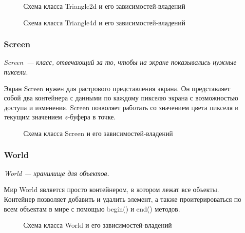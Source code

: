 \documentclass{article}
\begin{document}
\begin{center}
\begin{figure}[h]
\caption{Схема класса Triangle2d и его зависимостей-владений}
\label{ris:image}
\end{figure}
\begin{figure}[h]
\caption{Схема класса Triangle4d и его зависимостей-владений}
\label{ris:image}
\end{figure}
\end{center}

\newpage

\subsubsection{Screen}

\textit{Screen~--- класс, отвечающий за то, чтобы на экране показывались нужные пиксели.}
\medskip

Экран Screen нужен для растрового представления экрана. Он представляет собой два контейнера с данными по каждому пикселю экрана с возможностью доступа и изменения. Screen позволяет работать со значением цвета пикселя и текущим значением $z$-буфера в точке.

\begin{center}
\begin{figure}[H]
\caption{Схема класса Screen и его зависимостей-владений}
\label{ris:image}
\end{figure}
\end{center}

\subsubsection{World}

\textit{World --- хранилище для объектов.}
\medskip

Мир World является просто контейнером, в котором лежат все объекты. Контейнер позволяет добавить и удалить элемент, а также проитерироваться по всем объектам в мире с помощью begin() и end() методов.

\begin{center}
\begin{figure}[H]
\caption{Схема класса World и его зависимостей-владений}
\label{ris:image}
\end{figure}
\end{center}
\end{document}
